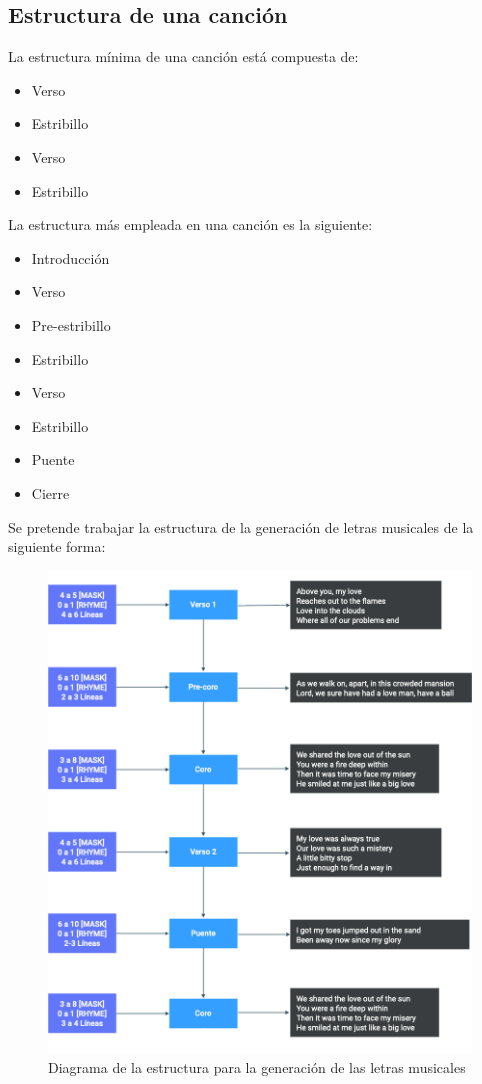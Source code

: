 \documentclass[12pt, a4paper, titlepage]{report}
\begin{document}
			\subsection{Estructura de una canción}
			La estructura mínima de una canción está compuesta de:\par
			\begin{itemize}
			  \item Verso
			  \item Estribillo
			  \item Verso
			  \item Estribillo
			\end{itemize}\par
			La estructura más empleada en una canción es la siguiente:
			\begin{itemize}
			  \item Introducción
			  \item Verso
			  \item Pre-estribillo
			  \item Estribillo
			  \item Verso
			  \item Estribillo
			  \item Puente
			  \item Cierre
			\end{itemize}
		
			Se pretende trabajar la estructura de la generación de letras musicales de la siguiente forma:
			
			\begin{figure}[H] \caption{Diagrama de la estructura para la generación de las letras musicales}
				\includegraphics[scale=.45]{./imagenes/Disenio/Arquitectura/Generacion letras.png}
				\centering 
			\end{figure}
		
\end{document}
